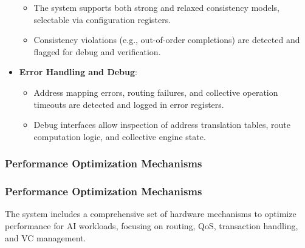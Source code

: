 \documentclass[11pt,a4paper]{article}
\begin{document}
\begin{itemize}
\begin{itemize}
        \item The system supports both strong and relaxed consistency models, selectable via configuration registers.
        \item Consistency violations (e.g., out-of-order completions) are detected and flagged for debug and verification.
    \end{itemize}
    \item \textbf{Error Handling and Debug}:
    \begin{itemize}
        \item Address mapping errors, routing failures, and collective operation timeouts are detected and logged in error registers.
        \item Debug interfaces allow inspection of address translation tables, route computation logic, and collective engine state.
    \end{itemize}
\end{itemize}

\subsubsection{Performance Optimization Mechanisms}

\subsubsection{Performance Optimization Mechanisms}

The system includes a comprehensive set of hardware mechanisms to optimize performance for AI workloads, focusing on routing, QoS, transaction handling, and VC management.
\end{document}
